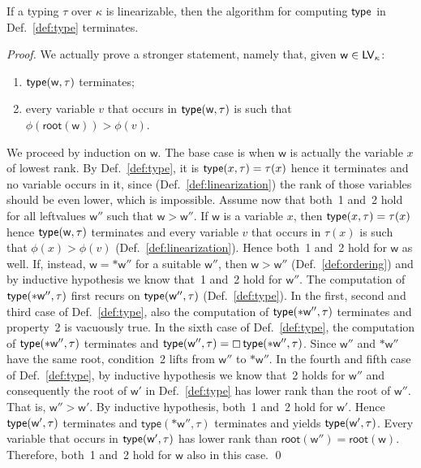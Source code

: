 \begin{proposition}\label{prop:termination}
  If a typing $\tau$ over $\kappa$ is linearizable, then the algorithm for computing $\mathsf{type}$ in
  Def.~\ref{def:type} terminates.
\end{proposition}
\begin{proof}
  We actually prove a stronger statement, namely that, given $\mathsf{w}\in\mathsf{LV}_\kappa$:
  \begin{enumerate}
  \item $\mathsf{type}(\mathsf{w},\tau)$ terminates;
  \item every variable $v$ that occurs in $\mathsf{type}(\mathsf{w},\tau)$
    is such that $\phi(\mathsf{root}(\mathsf{w}))>\phi(v)$.
  \end{enumerate}
  We proceed by induction on $\mathsf{w}$. The base case is when $\mathsf{w}$ is actually the variable $x$
  of lowest rank. By Def.~\ref{def:type}, it is $\mathsf{type}(x,\tau)=\tau(x)$ hence it terminates and
  no variable occurs in it, since (Def.~\ref{def:linearization})
  the rank of those variables should be even lower, which is impossible.
  Assume now that both~1 and~2 hold for all leftvalues
  $\mathsf{w}''$ such that $\mathsf{w}>\mathsf{w}''$.
  If $\mathsf{w}$ is a variable $x$, then $\mathsf{type}(x,\tau)=\tau(x)$ hence
  $\mathsf{type}(\mathsf{w},\tau)$ terminates and every variable $v$ that occurs in $\tau(x)$ is such that
  $\phi(x)>\phi(v)$ (Def.~\ref{def:linearization}). Hence both~1 and~2 hold for $\mathsf{w}$ as well.
  If, instead, $\mathsf{w}=\mathtt{*}\mathsf{w}''$ for a suitable $\mathsf{w}''$,
  then $\mathsf{w}>\mathsf{w}''$ (Def.~\ref{def:ordering}) and by inductive hypothesis we know that~1
  and~2 hold for $\mathsf{w}''$. The computation of $\mathsf{type}(\mathtt{*}\mathsf{w}'',\tau)$
  first recurs on $\mathsf{type}(\mathsf{w}'',\tau)$ (Def.~\ref{def:type}).
  In the first, second and third case of Def.~\ref{def:type}, also the
  computation of $\mathsf{type}(\mathtt{*}\mathsf{w}'',\tau)$ terminates and property~2 is vacuously true.
  In the sixth case of Def.~\ref{def:type}, the computation of
  $\mathsf{type}(\mathtt{*}\mathsf{w}'',\tau)$ terminates and
  $\mathsf{type}(\mathsf{w}'',\tau)=\boxempty\,{\mathsf{type}(\mathtt{*}\mathsf{w}'',\tau)}$.
  Since $\mathsf{w}''$ and $\mathtt{*}\mathsf{w}''$ have the same root, condition~2
  lifts from $\mathsf{w}''$ to $\mathtt{*}\mathsf{w}''$.
  In the fourth and fifth case of Def.~\ref{def:type}, by inductive hypothesis we know that~2 holds
  for $\mathsf{w}''$ and consequently the root of $\mathsf{w}'$ in Def.~\ref{def:type}
  has lower rank than the root of $\mathsf{w}''$. That is, $\mathsf{w}''>\mathsf{w}'$.
  By inductive hypothesis, both~1 and~2 hold for $\mathsf{w}'$. Hence
  $\mathsf{type}(\mathsf{w}',\tau)$ terminates and
  $\mathsf{type}(\mathtt{*}\mathsf{w}'',\tau)$ terminates and yields
  $\mathsf{type}(\mathsf{w}',\tau)$.
  Every variable that occurs in
  $\mathsf{type}(\mathsf{w}',\tau)$ has lower rank than
  $\mathsf{root}(\mathsf{w}'')=\mathsf{root}(\mathsf{w})$. Therefore,
  both~1 and~2 hold for $\mathsf{w}$ also in this case.
  \qed
\end{proof}
